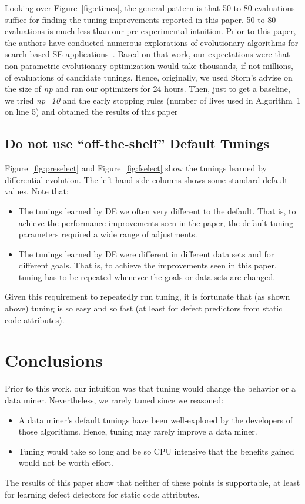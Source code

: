 \documentclass{sig-alternative}
\newcommand{\bi}{\begin{itemize}[leftmargin=0.4cm]}
\newcommand{\ei}{\end{itemize}}
\newcommand{\fig}[1]{Figure~\ref{fig:#1}}
\begin{document}
Looking over \fig{etimes}, the general pattern is that 50 to 80 evaluations suffice for finding the tuning
improvements reported in this paper. 
50 to 80 evaluations is  much less than our pre-experimental intuition.
Prior to this paper, the authors have conducted numerous explorations of evolutionary algorithms
for search-based SE applications~\cite{krall15,krall15:hm,fea02a,me07f,Green}. Based
on that work, our expectations were that non-parametric evolutionary optimization would
take thousands, if not millions, of evaluations of candidate tunings. Hence, originally,
we used Storn's advise on the size of {\em np} and ran our optimizers for 24 hours. 
Then, just
to get a baseline, we tried {\em np=10} and the early stopping rules (number of lives used in
Algorithm~1 on line 5) and obtained the results of this paper



\subsection{Do not use ``off-the-shelf''  Default Tunings}\label{sect:variance}
 
 \fig{preselect} and \fig{fselect} show the tunings learned by differential evolution. 
The left hand side columns shows some standard default values. Note that:
\bi
\item
The tunings learned by DE
we often very different to the default. That is, to achieve the performance improvements seen in the paper,
the default tuning parameters required a wide range of adjustments.
\item The tunings learned by DE were different in different data sets and for different goals.
That is, to achieve the improvements seen in this paper, tuning has to be repeated whenever the goals or data
sets are changed.
\ei
Given this requirement to repeatedly run tuning, it is fortunate that (as shown above)
tuning is so easy and so fast (at least for defect predictors from static code attributes).
\section{Conclusions}
 
Prior to this work, our intuition was that tuning would change the behavior or a data miner. Nevertheless, we rarely tuned
since we reasoned:
\bi
\item A data miner's default tunings have been well-explored by the developers of those algorithms. Hence, tuning may rarely improve a data miner.
\item 
Tuning would take so long and be so CPU intensive that the benefits gained   would not be worth effort.
\ei
The results of this paper show that neither of these points is supportable, at least for learning
defect detectors for static code attributes. 
\end{document}
